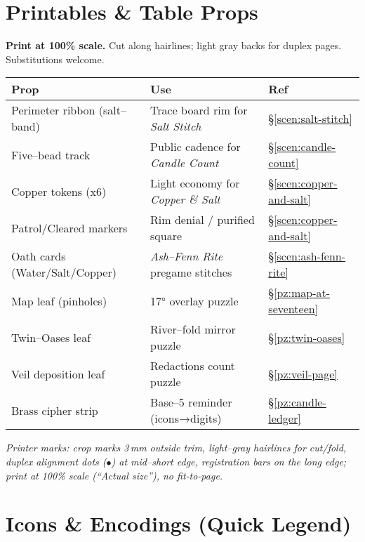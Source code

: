 \documentclass[11pt]{article}
\begin{document}
\begin{itemize}
\clearpage
\section{Printables \& Table Props}
\label{app:printables}
{}

\noindent\textbf{Print at 100\% scale.} Cut along hairlines; light gray backs for duplex pages. Substitutions welcome.

\medskip
\begin{tabular}{p{5.2cm} p{5.6cm} p{3.7cm}}
\toprule
\textbf{Prop} & \textbf{Use} & \textbf{Ref}\\
\midrule
Perimeter ribbon (salt–band) & Trace board rim for \emph{Salt Stitch} & \S\ref{scen:salt-stitch}\\
Five–bead track & Public cadence for \emph{Candle Count} & \S\ref{scen:candle-count}\\
Copper tokens (x6) & Light economy for \emph{Copper \& Salt} & \S\ref{scen:copper-and-salt}\\
Patrol/Cleared markers & Rim denial / purified square & \S\ref{scen:copper-and-salt}\\
Oath cards (Water/Salt/Copper) & \emph{Ash–Fenn Rite} pregame stitches & \S\ref{scen:ash-fenn-rite}\\
Map leaf (pinholes) & 17° overlay puzzle & \S\ref{pz:map-at-seventeen}\\
Twin–Oases leaf & River–fold mirror puzzle & \S\ref{pz:twin-oases}\\
Veil deposition leaf & Redactions count puzzle & \S\ref{pz:veil-page}\\
Brass cipher strip & Base–5 reminder (icons→digits) & \S\ref{pz:candle-ledger}\\
\bottomrule
\end{tabular}
\medskip
\noindent\textit{Printer marks: crop marks 3\,mm outside trim, light–gray hairlines for cut/fold, duplex alignment dots (\(\bullet\)) at mid–short edge, registration bars on the long edge; print at 100\% scale (“Actual size”), no fit-to-page.}

\clearpage
\section{Icons \& Encodings (Quick Legend)}
\label{app:legend}
{}


\end{itemize}
\end{document}
